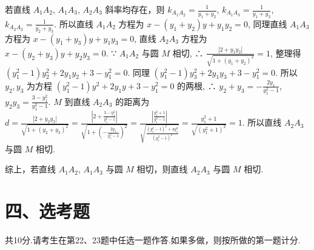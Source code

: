\begin{question}[points=12]
\begin{solution}
若直线 $A_1A_2$, $A_1A_3$, $A_2A_3$ 斜率均存在，则 $k_{A_1A_2} = \frac{1}{y_1+y_2}$, $k_{A_1A_3} = \frac{1}{y_1+y_3}$, $k_{A_2A_3} = \frac{1}{y_2+y_3}$. 所以直线 $A_1A_2$ 方程为 $x - (y_1+y_2)y + y_1y_2 = 0$, 同理直线 $A_1A_3$ 方程为 $x - (y_1+y_3)y + y_1y_3 = 0$, 直线 $A_2A_3$ 方程为 $x - (y_2+y_3)y + y_2y_3 = 0$. ∵ $A_1A_2$ 与圆 $M$ 相切, ∴ $\frac{|2 + y_1y_2|}{\sqrt{1+(y_1+y_2)^2}} = 1$, 整理得 $(y_1^2-1)y_2^2 + 2y_1y_2 + 3 - y_1^2 = 0$. 同理 $(y_1^2-1)y_3^2 + 2y_1y_3 + 3 - y_1^2 = 0$. 所以 $y_2, y_3$ 为方程 $(y_1^2-1)y^2 + 2y_1y + 3 - y_1^2 = 0$ 的两根, ∴ $y_2+y_3 = -\frac{2y_1}{y_1^2-1}$, $y_2y_3 = \frac{3 - y_1^2}{y_1^2-1}$. $M$ 到直线 $A_2A_3$ 的距离为 $d = \frac{|2 + y_2y_3|}{\sqrt{1+(y_2+y_3)^2}} = \frac{|2 + \frac{3-y_1^2}{y_1^2-1}|}{\sqrt{1+\left(-\frac{2y_1}{y_1^2-1}\right)^2}} = \frac{|\frac{y_1^2+1}{y_1^2-1}|}{\sqrt{\frac{(y_1^2-1)^2+4y_1^2}{(y_1^2-1)^2}}} = \frac{y_1^2+1}{\sqrt{(y_1^2+1)^2}} = 1$. 所以直线 $A_2A_3$ 与圆 $M$ 相切.

综上，若直线 $A_1A_2$, $A_1A_3$ 与圆 $M$ 相切，则直线 $A_2A_3$ 与圆 $M$ 相切.
\end{solution}
\end{question}

\section*{四、选考题}
共10分.请考生在第22、23题中任选一题作答.如果多做，则按所做的第一题计分.

